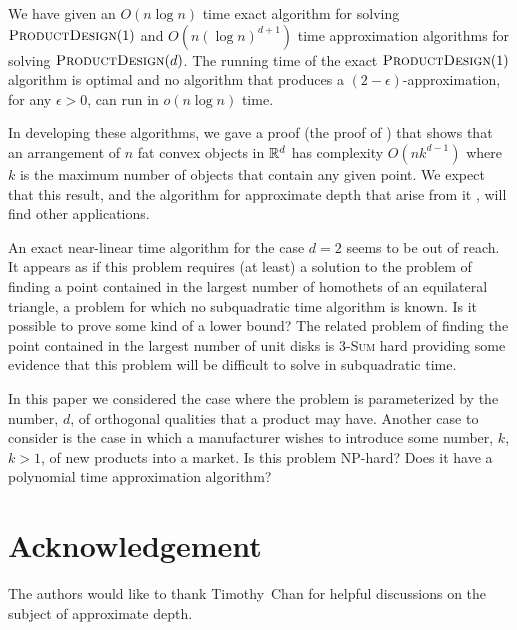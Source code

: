 \documentclass[lotsofwhite]{patmorin}
\newcommand{\eps}{\epsilon}
\begin{document}
We have given an $O(n\log n)$ time exact algorithm for solving
$\textsc{ProductDesign}(1)$ and $O(n(\log n)^{d+1})$ time approximation
algorithms for solving $\textsc{ProductDesign}(d)$.  The running time of
the exact $\textsc{ProductDesign}(1)$ algorithm is optimal and no algorithm
that produces a $(2-\eps)$-approximation, for any $\epsilon > 0$, can run
in $o(n\log n)$ time.  

In developing these algorithms, we gave a proof (the
proof of ) that shows that an arrangement of $n$ fat convex
objects in $\mathbb{R}^d$ has complexity $O(nk^{d-1})$ where $k$ is the maximum
number of objects that contain any given point. We expect that this result,
and the algorithm for approximate depth that arise from it \cite{ah08},
will find other applications.

An exact near-linear time algorithm for the case $d=2$ seems to be out of
reach.  It appears as if this problem requires (at least) a solution to the
problem of finding a point contained in the largest number of homothets of
an equilateral triangle, a problem for which no subquadratic time algorithm
is known.  Is it possible to prove some kind of a lower bound?  The related
problem of finding the point contained in the largest number of unit disks
is \textsc{3-Sum} hard \cite{ah08} providing some evidence that this
problem will be difficult to solve in subquadratic time.

In this paper we considered the case where the problem is parameterized by
the number, $d$, of orthogonal qualities that a product may have.  Another
case to consider is the case in which a manufacturer wishes to introduce
some number, $k$, $k>1$, of new products into a market.   Is this problem
NP-hard?  Does it have a polynomial time approximation algorithm?


\section*{Acknowledgement}

The authors would like to thank Timothy~Chan for helpful discussions
on the subject of approximate depth.



\end{document}
